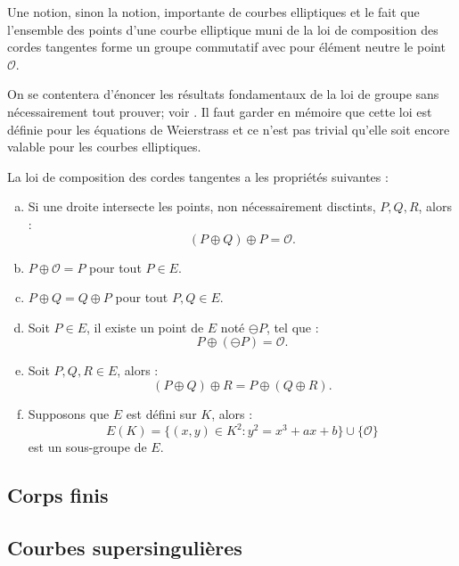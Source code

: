 \documentclass[a4paper]{article} %
\numberwithin{section}{part}
\numberwithin{equation}{section}
\newcommand\EO{\mathcal{O}}
\begin{document}
Une notion, sinon la notion, importante de courbes elliptiques et le fait que
l'ensemble des points d'une courbe elliptique muni de la loi de composition des
cordes tangentes forme un groupe commutatif avec pour élément neutre le point 
$\EO$.\par
On se contentera d'énoncer les résultats fondamentaux de la loi de groupe sans 
nécessairement tout prouver; voir \cite[Chap.~III, p~51-53]{Sil}. Il faut garder
en mémoire que cette loi est définie pour les équations de Weierstrass et ce 
n'est pas trivial qu'elle soit encore valable pour les courbes elliptiques. 

\begin{prop}
La loi de composition des cordes tangentes a les propriétés suivantes :
\begin{enumerate}[(a)]
\item Si une droite intersecte les points, non nécessairement disctints, $P, Q,
R$, alors :
\[(P\oplus Q) \oplus P = \EO.\]

\item $P\oplus\EO=P$ pour tout $P\in E$.

\item $P\oplus Q = Q \oplus P$ pour tout $P, Q\in E$.

\item Soit $P\in E$, il existe un point de $E$ noté $\ominus P$, tel que :
\[P\oplus(\ominus P) = \EO.\]

\item Soit $P, Q, R \in E$, alors :
\[(P\oplus Q) \oplus R = P\oplus (Q\oplus R).\]

\item Supposons que $E$ est défini sur $K$, alors :
\[E(K) = \lbrace{(x,y)\in K^2 : y^2 = x^3 + ax +
b}\rbrace\cup\lbrace{\EO}\rbrace\]
est un sous-groupe de $E$.
\end{enumerate}
\end{prop}
\subsection{Corps finis}


\subsection{Courbes supersingulières}
\end{document}
